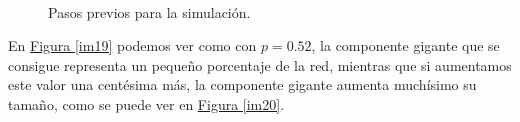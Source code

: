 \documentclass[paper=a4, fontsize=11pt]{article} %
\numberwithin{equation}{section} %
\numberwithin{figure}{section} %
\numberwithin{table}{section} %
\begin{document}
\begin{figure}[H]
    \centering
    \mbox{
        \qquad
    }
    \mbox{
        \qquad
    }
    \caption{Pasos previos para la simulación.}
    \label{imej24}
\end{figure}

En \hyperref[im19]{Figura \ref{im19}} podemos ver como con $p=0.52$, la componente gigante que se consigue representa un pequeño porcentaje de la red, mientras que si aumentamos este valor una centésima más, la componente gigante aumenta muchísimo su tamaño, como se puede ver en \hyperref[im20]{Figura \ref{im20}}.
\end{document}
